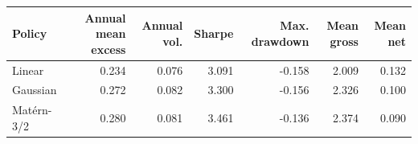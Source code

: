 \begin{tabular}{lrrrrrr}
\toprule
Policy & Annual mean excess & Annual vol. & Sharpe & Max. drawdown & Mean gross & Mean net \\
\midrule
Linear & 0.234 & 0.076 & 3.091 & -0.158 & 2.009 & 0.132 \\
Gaussian & 0.272 & 0.082 & 3.300 & -0.156 & 2.326 & 0.100 \\
Matérn-3/2 & 0.280 & 0.081 & 3.461 & -0.136 & 2.374 & 0.090 \\
\bottomrule
\end{tabular}
